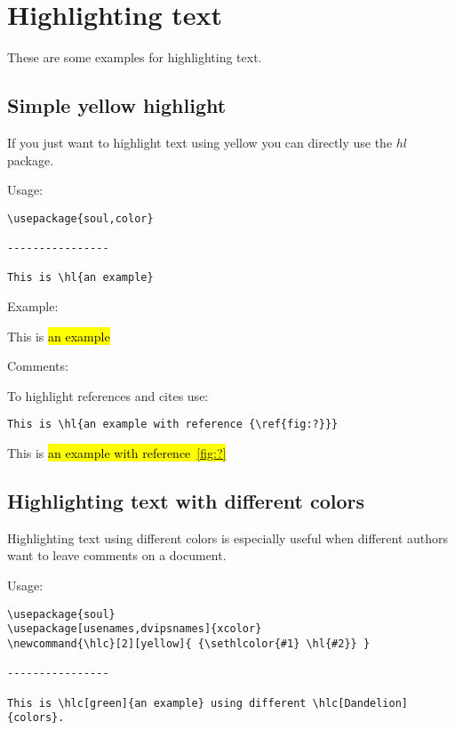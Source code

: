 \documentclass[12pt]{article}
\newcommand{\hlc}[2][yellow]{ {\sethlcolor{#1} \hl{#2}} }
\begin{document}
\section*{Highlighting text}

\noindent These are some examples for highlighting text.




\subsection*{Simple yellow highlight}

If you just want to highlight text using yellow you can directly use the $hl$ package.

\noindent Usage:

\begin{Verbatim}[frame=single,framesep=0.125in,fontsize=\footnotesize]
\usepackage{soul,color}

----------------

This is \hl{an example}
\end{Verbatim}

\noindent Example:

This is \hl{an example}

\noindent Comments:

To highlight references and cites use:

\begin{Verbatim}[frame=single,framesep=0.125in,fontsize=\footnotesize]
This is \hl{an example with reference {\ref{fig:?}}}
\end{Verbatim}

This is \hl{an example with reference~{\ref{fig:?}}}




\subsection*{Highlighting text with different colors}

Highlighting text using different colors is especially useful when different authors want to leave comments on a document.

\noindent Usage:

\begin{Verbatim}[frame=single,framesep=0.125in,fontsize=\footnotesize]
\usepackage{soul}
\usepackage[usenames,dvipsnames]{xcolor}
\newcommand{\hlc}[2][yellow]{ {\sethlcolor{#1} \hl{#2}} }
	
----------------
	
This is \hlc[green]{an example} using different \hlc[Dandelion]{colors}.
\end{Verbatim}
\end{document}
